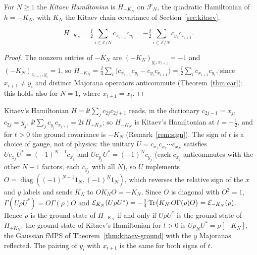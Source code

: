 \begin{definition}\label{def:kitaev-ham}
For $N\geq1$ the \emph{Kitaev Hamiltonian} is $H_{-K_N}$ on $\mathcal F_N$, the quadratic Hamiltonian
of $h=-K_N$, with $K_N$ the Kitaev chain covariance of
Section~\ref{sec:kitaev}.
\end{definition}
\begin{lemma}\label{lem:kitaev-explicit}
\[
 H_{-K_N}=\tfrac{\ii}{2}\sum_{i\in\mathbb Z/N}c_{x_{i+1}}c_{y_i}=-\tfrac{\ii}{2}\sum_{i\in\mathbb Z/N}c_{y_i}c_{x_{i+1}} .
\]
\end{lemma}
\begin{proof}
The nonzero entries of $-K_N$ are $(-K_N)_{y_i,x_{i+1}}=-1$ and $(-K_N)_{x_{i+1},y_i}=1$, so
$H_{-K_N}=\tfrac{\ii}{4}\sum_i\bigl(c_{x_{i+1}}c_{y_i}-c_{y_i}c_{x_{i+1}}\bigr)
=\tfrac{\ii}{2}\sum_ic_{x_{i+1}}c_{y_i}$, since $x_{i+1}\neq y_i$ and distinct Majorana operators
anticommute (Theorem~\ref{thm:car}); this holds also for $N=1$, where $x_{i+1}=x_i$.
\end{proof}
\begin{remark}\label{rem:kitaev-convention}
Kitaev's Hamiltonian $H=\ii t\sum_jc_{2j}c_{2j+1}$ reads, in the dictionary $c_{2j-1}=x_j$,
$c_{2j}=y_j$, $\ii t\sum_jc_{y_j}c_{x_{j+1}}=2t\,H_{+K_N}$; so $H_{-K_N}$ is Kitaev's Hamiltonian
at $t=-\tfrac12$, and for $t>0$ the ground covariance is $-K_N$ (Remark~\ref{rem:sign}). The
sign of $t$ is a choice of gauge, not of physics: the unitary $U=c_{x_1}c_{x_2}\cdots c_{x_N}$
satisfies $Uc_{x_j}U^*=(-1)^{N-1}c_{x_j}$ and $Uc_{y_j}U^*=(-1)^Nc_{y_j}$ (each $c_{x_j}$
anticommutes with the other $N-1$ factors, each $c_{y_j}$ with all $N$), so $U$ implements
$O=\operatorname{diag}((-1)^{N-1}1_N,(-1)^N1_N)$, which reverses the relative sign of the $x$
and $y$ labels and sends $K_N$ to $OK_NO=-K_N$. Since $O$ is diagonal with $O^2=1$,
$\Gamma(U\rho U^*)=O\Gamma(\rho)O$ and
$\mathcal E_{K_N}(U\rho U^*)=-\tfrac14\operatorname{Tr}\bigl(K_N\,O\Gamma(\rho)O\bigr)=\mathcal E_{-K_N}(\rho)$.
Hence $\rho$ is the ground state of $H_{-K_N}$ if and only if $U\rho U^*$ is the ground state
of $H_{+K_N}$: the ground state of Kitaev's Hamiltonian for $t>0$ is $U\rho_NU^*=\rho[-K_N]$,
the Gaussian fMPS of Theorem~\ref{thm:kitaev-ground} with the $y$ Majoranas reflected. The
pairing of $y_i$ with $x_{i+1}$ is the same for both signs of $t$.
\end{remark}

